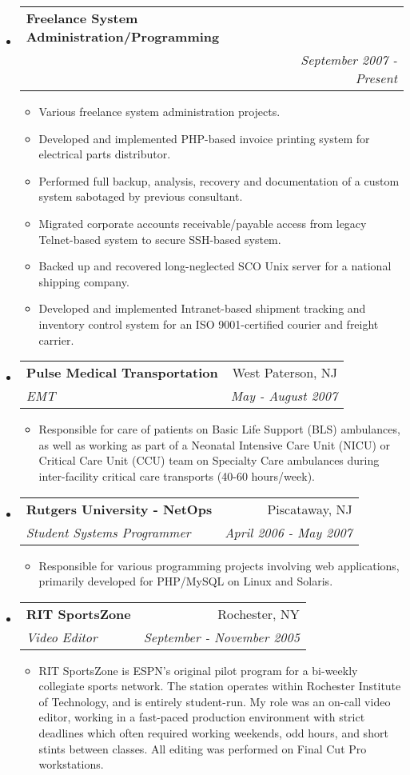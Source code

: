 \documentclass[letterpaper,11pt]{article}
\makeatletter
\newcommand{\resitem}[1]{\item #1 \vspace{-2pt}}
\newcommand{\ressubheading}[4]{
\begin{tabular*}{7.0in}{l@{\extracolsep{\fill}}r}
		\textbf{#1} & #2 \\
		\textit{#3} & \textit{#4} \\
\end{tabular*}\vspace{-6pt}}
\makeatother
\begin{document}
\begin{itemize}
\item
        \ressubheading{Freelance System Administration/Programming}{ }{ }{September 2007 - Present}
        \begin{itemize}
               \resitem{Various freelance system administration projects.}
               \resitem{Developed and implemented PHP-based invoice printing
                 system for electrical parts distributor.}
               \resitem{Performed full backup, analysis, recovery and documentation of a
                 custom system sabotaged by previous consultant.}
               \resitem{Migrated corporate accounts receivable/payable access
                 from legacy Telnet-based system to secure SSH-based system.}
               \resitem{Backed up and recovered long-neglected SCO Unix server
                 for a national shipping company.}
               \resitem{Developed and implemented Intranet-based shipment tracking and
                 inventory control system for an ISO 9001-certified courier
                 and freight carrier.}
        \end{itemize}

\item
        \ressubheading{Pulse Medical Transportation}{West Paterson, NJ}{EMT}{May - August 2007}
        \begin{itemize}
                \resitem{Responsible for care of patients on Basic Life
                  Support (BLS) ambulances, as well as working as part of a
                  Neonatal Intensive Care Unit (NICU) or Critical Care Unit
                  (CCU) team on Specialty Care
                  ambulances during inter-facility critical care transports
                  (40-60 hours/week).}
        \end{itemize}

\item
	\ressubheading{Rutgers University - NetOps}{Piscataway, NJ}{Student Systems Programmer}{April 2006 - May 2007}
	\begin{itemize}
		\resitem{Responsible for various programming projects
                  involving web applications, primarily developed for
                  PHP/MySQL on Linux and Solaris.}
	\end{itemize}

\item
        \ressubheading{RIT SportsZone}{Rochester, NY}{Video Editor}{September - November 2005}
        \begin{itemize}
                \resitem{RIT SportsZone is ESPN’s original pilot program for a
                bi-weekly collegiate sports network. The station operates
                within Rochester Institute of Technology, and is entirely
                student-run. My role was an on-call video editor, working in a
                fast-paced production environment with strict deadlines which
                often required working weekends, odd hours, and short stints
                between classes. All editing was performed on Final Cut Pro
                workstations. }
        \end{itemize}


\end{itemize}
\end{document}
